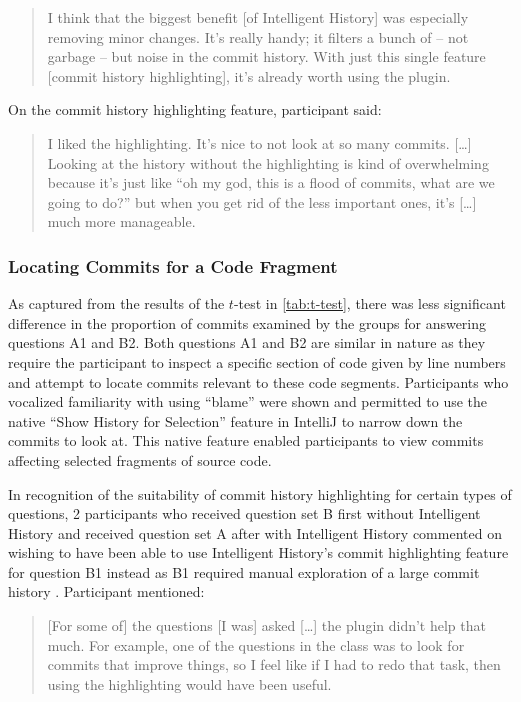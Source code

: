 \begin{quote}
  I think that the biggest benefit [of Intelligent History] was especially removing minor changes. 
  It’s really handy; it filters a bunch of -- not garbage -- but noise in the commit history. 
  With just this single feature [commit history highlighting], it’s already worth using the plugin.
\end{quote}

On the commit history highlighting feature, participant  said:

\begin{quote}
  I liked the highlighting. 
  It’s nice to not look at so many commits. 
  [\dots] Looking at the history without the highlighting is kind of overwhelming because it’s just like ``oh my god, this is a flood of commits, what are we going to do?'' 
  but when you get rid of the less important ones, it’s [\dots] much more manageable.
\end{quote}

\subsubsection{Locating Commits for a Code Fragment}

As captured from the results of the $t$-test in \autoref{tab:t-test}, there was less significant difference in the proportion of commits examined by the groups for answering questions A1 and B2.
Both questions A1 and B2 are similar in nature as they require the participant to inspect a specific section of code given by line numbers and attempt to locate commits relevant to these code segments.
Participants who vocalized familiarity with using  ``blame'' were shown and permitted to use the native ``Show History for Selection'' feature in IntelliJ to narrow down the commits to look at.
This native feature enabled participants to view commits affecting selected fragments of source code.

In recognition of the suitability of commit history highlighting for certain types of questions,
2 participants who received question set B first without Intelligent History and received question set A after with Intelligent History commented on wishing to have been able to use Intelligent History's commit highlighting feature for question B1 instead as B1
required manual exploration of a large commit history .
Participant  mentioned:

\begin{quote}
  [For some of] the questions [I was] asked [\dots] the plugin didn’t help that much. 
  For example, one of the questions in the  class was to look for commits that improve things, 
  so I feel like if I had to redo that task, then using the highlighting would have been useful.
\end{quote}

